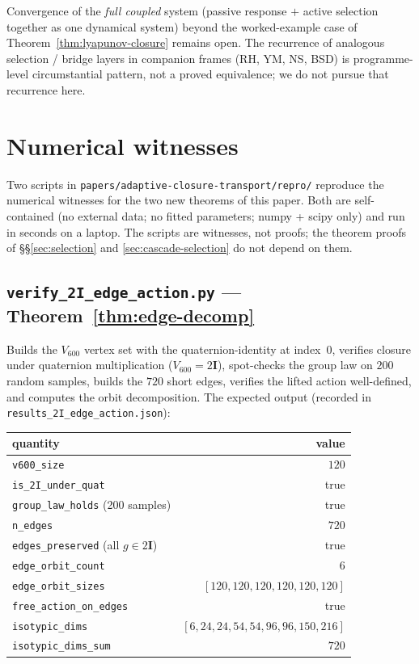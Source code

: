 \documentclass[11pt]{article}
\theoremstyle{definition}
\newcommand{\twoI}{2\mathbf{I}}
\begin{document}
\noindent Convergence of the \emph{full coupled} system (passive response $+$ active selection together as one dynamical system) beyond the worked-example case of Theorem~\ref{thm:lyapunov-closure} remains open. The recurrence of analogous selection / bridge layers in companion frames (RH, YM, NS, BSD) is programme-level circumstantial pattern, not a proved equivalence; we do not pursue that recurrence here.

\section{Numerical witnesses}\label{sec:numerical}

Two scripts in \texttt{papers/adaptive-closure-transport/repro/} reproduce
the numerical witnesses for the two new theorems of this paper. Both are
self-contained (no external data; no fitted parameters; numpy + scipy only)
and run in seconds on a laptop. The scripts are witnesses, not proofs;
the theorem proofs of \S\S\ref{sec:selection} and
\ref{sec:cascade-selection} do not depend on them.

\subsection*{\texttt{verify\_2I\_edge\_action.py} — Theorem~\ref{thm:edge-decomp}}

Builds the $V_{600}$ vertex set with the quaternion-identity at index~$0$,
verifies closure under quaternion multiplication ($V_{600} = \twoI$),
spot-checks the group law on $200$ random samples, builds the $720$ short
edges, verifies the lifted action well-defined, and computes the orbit
decomposition. The expected output (recorded in \texttt{results\_2I\_edge\_action.json}):

\begin{center}\small
\begin{tabular}{@{}lr@{}}
\toprule
quantity & value \\
\midrule
\texttt{v600\_size} & $120$ \\
\texttt{is\_2I\_under\_quat} & true \\
\texttt{group\_law\_holds} (200 samples) & true \\
\texttt{n\_edges} & $720$ \\
\texttt{edges\_preserved} (all $g \in \twoI$) & true \\
\texttt{edge\_orbit\_count} & $\boxed{6}$ \\
\texttt{edge\_orbit\_sizes} & $[120, 120, 120, 120, 120, 120]$ \\
\texttt{free\_action\_on\_edges} & true \\
\texttt{isotypic\_dims} & $[6, 24, 24, 54, 54, 96, 96, 150, 216]$ \\
\texttt{isotypic\_dims\_sum} & $720$ \\
\bottomrule
\end{tabular}
\end{center}
\end{document}
